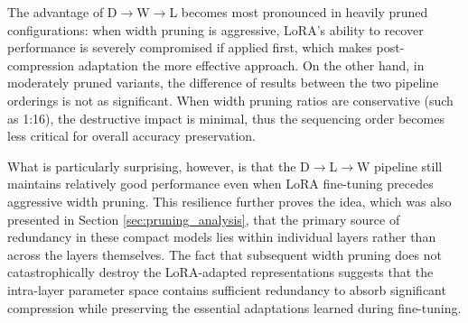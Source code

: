 The advantage of D$\rightarrow$W$\rightarrow$L becomes most pronounced in heavily pruned configurations: when width pruning is aggressive, LoRA's ability to recover performance is severely compromised if applied first, which makes post-compression adaptation the more effective approach. On the other hand, in moderately pruned variants, the difference of results between the two pipeline orderings is not as significant. When width pruning ratios are conservative (such as 1:16), the destructive impact is minimal, thus the sequencing order becomes less critical for overall accuracy preservation.

What is particularly surprising, however, is that the D$\rightarrow$L$\rightarrow$W pipeline still maintains relatively good performance even when LoRA fine-tuning precedes aggressive width pruning. This resilience further proves the idea, which was also presented in Section \ref{sec:pruning_analysis}, that the primary source of redundancy in these compact models lies within individual layers rather than across the layers themselves. The fact that subsequent width pruning does not catastrophically destroy the LoRA-adapted representations suggests that the intra-layer parameter space contains sufficient redundancy to absorb significant compression while preserving the essential adaptations learned during fine-tuning.

